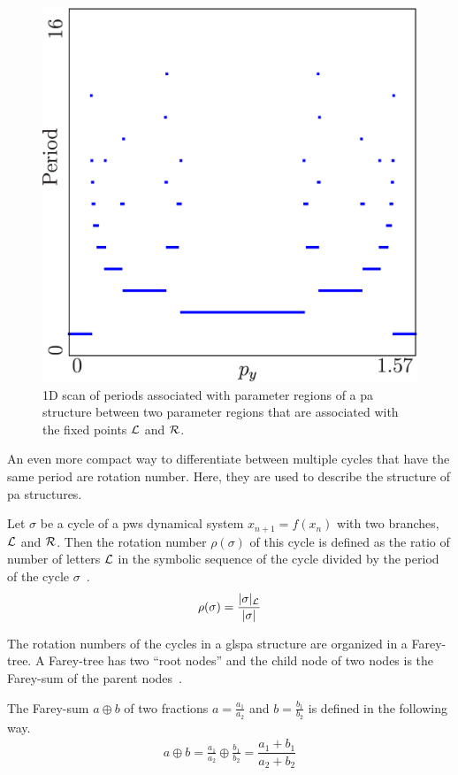 \begin{figure}
	\centering
	\includegraphics[width=.5 \textwidth]{../Figures/2/2.1/result.png}
	\caption[1D scan of periods associated with parameter regions of a  structure between two parameter regions that are associated with the fixed points $\L$ and $\R$]{
		1D scan of periods associated with parameter regions of a \gls{pa} structure between two parameter regions that are associated with the fixed points $\L$ and $\R$.
	}
\end{figure}

An even more compact way to differentiate between multiple cycles that have the same period are rotation number.
Here, they are used to describe the structure of \gls{pa} structures.

\begin{definition}
	\label{def:rotation.numbers}
	Let $\sigma$ be a cycle of a \gls{pws} dynamical system $x_{n+1} = f(x_n)$ with two branches, $\L$ and $\R$.
	Then the rotation number $\rho(\sigma)$ of this cycle is defined as the ratio of number of letters $\L$ in the symbolic sequence of the cycle divided by the period of the cycle $\sigma$~\cite{Keener80}.
	\begin{align}
		\rho(\sigma) = \dfrac{|\sigma|_{\mathcal{L}}}{|\sigma|}
	\end{align}
\end{definition}

The rotation numbers of the cycles in a gls{pa} structure are organized in a Farey-tree.
A Farey-tree has two ``root nodes'' and the child node of two nodes is the Farey-sum of the parent nodes~\cite{granados14adding}.

\begin{definition}
	The Farey-sum $a \oplus b$ of two fractions $a = \frac{a_1}{a_2}$ and $b = \frac{b_1}{b_2}$ is defined in the following way.
	\begin{align}
		a \oplus b = \frac{a_1}{a_2} \oplus \frac{b_1}{b_2} = \dfrac{a_1 + b_1}{a_2 + b_2}
	\end{align}
\end{definition}

